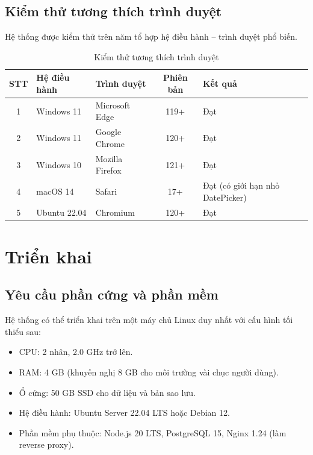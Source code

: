 \documentclass[../DoAn.tex]{subfiles}
\begin{document}
\subsection{Kiểm thử tương thích trình duyệt}
\label{subsection:4.4.3}

Hệ thống được kiểm thử trên năm tổ hợp hệ điều hành -- trình duyệt phổ biến.

\begin{table}[H]
\centering
\caption{Kiểm thử tương thích trình duyệt}
\label{tab:kt-trinhduyet}
\begin{tabular}{|c|p{3cm}|p{3cm}|c|p{4cm}|}
\hline
\textbf{STT} & \textbf{Hệ điều hành} & \textbf{Trình duyệt} & \textbf{Phiên bản} & \textbf{Kết quả} \\ \hline
1 & Windows 11 & Microsoft Edge & 119+ & Đạt \\ \hline
2 & Windows 11 & Google Chrome & 120+ & Đạt \\ \hline
3 & Windows 10 & Mozilla Firefox & 121+ & Đạt \\ \hline
4 & macOS 14 & Safari & 17+ & Đạt (có giới hạn nhỏ DatePicker) \\ \hline
5 & Ubuntu 22.04 & Chromium & 120+ & Đạt \\ \hline
\end{tabular}
\end{table}

\section{Triển khai}
\label{section:4.5}

\subsection{Yêu cầu phần cứng và phần mềm}
\label{subsection:4.5.1}

Hệ thống có thể triển khai trên một máy chủ Linux duy nhất với cấu hình tối thiểu sau:

\begin{itemize}
    \item CPU: 2 nhân, 2.0 GHz trở lên.
    \item RAM: 4 GB (khuyến nghị 8 GB cho môi trường vài chục người dùng).
    \item Ổ cứng: 50 GB SSD cho dữ liệu và bản sao lưu.
    \item Hệ điều hành: Ubuntu Server 22.04 LTS hoặc Debian 12.
    \item Phần mềm phụ thuộc: Node.js 20 LTS, PostgreSQL 15, Nginx 1.24 (làm reverse proxy).
\end{itemize}
\end{document}
